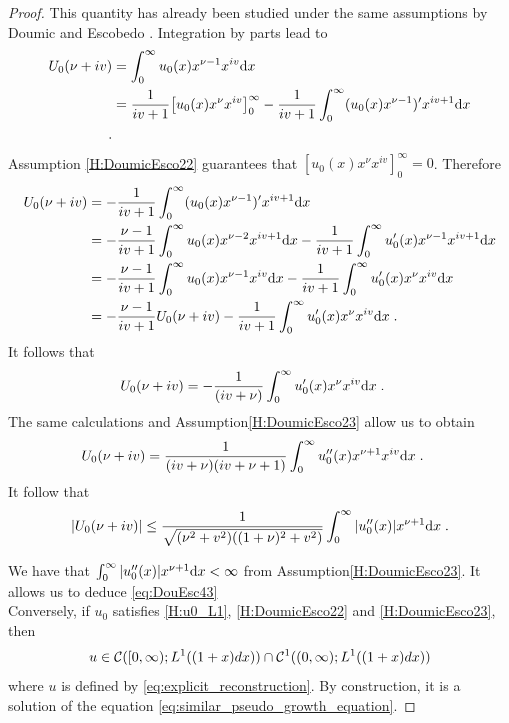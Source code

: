 \documentclass[11pt]{amsart}
\begin{document}
\begin{proof}
This quantity has already been studied under the same assumptions by Doumic and Escobedo \cite{doumic2016time}. Integration by parts lead to 
    \begin{align*}
        U_0(\nu + i v) 
        &= \int_0^\infty u_0(x) x^{\nu-1}x^{i v}\mathrm dx \\
        &= \frac{1}{iv + 1} \big[ u_0(x) x^{\nu} x^{i v} \big]_0^\infty - \frac{1}{iv + 1} \int_0^\infty (u_0(x) x^{\nu-1})' x^{i v+1}\mathrm dx \\
        \; .
    \end{align*}
Assumption \eqref{H:DoumicEsco22} guarantees that $[ u_0(x) x^{\nu} x^{i v} ]_0^\infty = 0$. Therefore
    \begin{align*}
        U_0(\nu + i v) 
        &= - \frac{1}{iv + 1} \int_0^\infty (u_0(x) x^{\nu-1})' x^{i v+1}\mathrm dx \\
        &= - \frac{\nu - 1}{iv + 1} \int_0^\infty u_0(x) x^{\nu-2} x^{i v + 1}\mathrm dx  - \frac{1}{iv + 1} \int_0^\infty u_0'(x) x^{\nu-1} x^{i v + 1}\mathrm dx \\
        &= - \frac{\nu - 1}{iv + 1} \int_0^\infty u_0(x) x^{\nu-1} x^{i v}\mathrm dx  - \frac{1}{iv + 1} \int_0^\infty u_0'(x) x^{\nu} x^{i v}\mathrm dx \\
        &= - \frac{\nu - 1}{iv + 1} U_0(\nu + i v)   - \frac{1}{iv + 1} \int_0^\infty u_0'(x) x^{\nu} x^{i v}\mathrm dx
        \; .
    \end{align*}
It follows that 
    \begin{align*}
        U_0(\nu + i v)
        &= - \frac{1}{(iv + \nu)}\int_0^\infty u_0'(x) x^{\nu} x^{i v}\mathrm dx
        \; .
    \end{align*}
The same calculations and Assumption\eqref{H:DoumicEsco23} allow us to obtain 
    \begin{align*}
        U_0(\nu + i v)
        &=  \frac{1}{(iv + \nu)(iv + \nu + 1)}\int_0^\infty u_0''(x) x^{\nu + 1} x^{i v}\mathrm dx
        \; .
    \end{align*}
It follow that 
    \begin{equation*}
        |U_0(\nu + i v)| \leq \frac{1}{\sqrt{(\nu^2 + v^2)((1+\nu)^2 + v^2)}} \int_0^\infty |u_0''(x)| x^{\nu + 1} \mathrm dx
        \; .
    \end{equation*}

We have that $\int_0^\infty |u_0''(x)| x^{\nu + 1} \mathrm dx < \infty$ from Assumption\eqref{H:DoumicEsco23}. It allows us to deduce \eqref{eq:DouEsc43} \\

Conversely, if $u_0$ satisfies \eqref{H:u0_L1}, \eqref{H:DoumicEsco22} and \eqref{H:DoumicEsco23}, then 
 $$u \in \mathcal{C}([0, \infty); L^1((1+x)dx)) \cap \mathcal{C}^1((0, \infty); L^1((1+x)dx))$$
where $u$ is defined by \eqref{eq:explicit_reconstruction}. By construction, it is a solution of the equation \eqref{eq:similar_pseudo_growth_equation}.
\end{proof}
\end{document}
